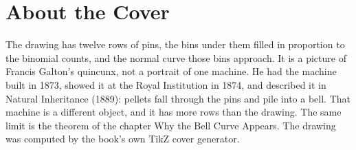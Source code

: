 \backmatter
\cleardoublepage
\chapter*{About the Cover}
\noindent The drawing has twelve rows of pins, the bins under them filled in proportion to the binomial counts, and the normal curve those bins approach. It is a picture of Francis Galton's quincunx, not a portrait of one machine. He had the machine built in 1873, showed it at the Royal Institution in 1874, and described it in Natural Inheritance (1889): pellets fall through the pins and pile into a bell. That machine is a different object, and it has more rows than the drawing. The same limit is the theorem of the chapter Why the Bell Curve Appears. The drawing was computed by the book's own TikZ cover generator.
